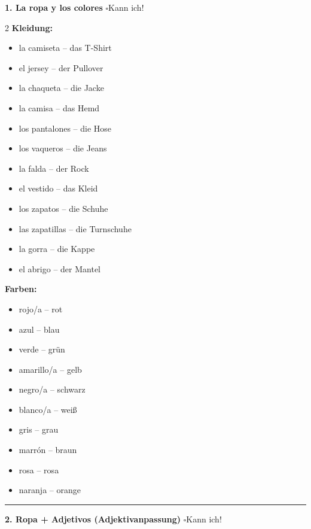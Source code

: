 \documentclass[10pt, a4paper]{article}
\newcommand{\checkbox}{$\square$\hspace{5pt}}
\begin{document}
\begin{themabox}

\textbf{\textcolor{spanisch}{1. La ropa y los colores}} \hfill \checkbox Kann ich!

\begin{multicols}{2}
\small
\textbf{Kleidung:}
\begin{itemize}[leftmargin=15pt, itemsep=1pt]
    \item la camiseta -- das T-Shirt
    \item el jersey -- der Pullover
    \item la chaqueta -- die Jacke
    \item la camisa -- das Hemd
    \item los pantalones -- die Hose
    \item los vaqueros -- die Jeans
    \item la falda -- der Rock
    \item el vestido -- das Kleid
    \item los zapatos -- die Schuhe
    \item las zapatillas -- die Turnschuhe
    \item la gorra -- die Kappe
    \item el abrigo -- der Mantel
\end{itemize}

\columnbreak

\textbf{Farben:}
\begin{itemize}[leftmargin=15pt, itemsep=1pt]
    \item rojo/a -- rot
    \item azul -- blau
    \item verde -- grün
    \item amarillo/a -- gelb
    \item negro/a -- schwarz
    \item blanco/a -- weiß
    \item gris -- grau
    \item marrón -- braun
    \item rosa -- rosa
    \item naranja -- orange
\end{itemize}
\end{multicols}

\vspace{3pt}
\hrule
\vspace{3pt}

\textbf{\textcolor{spanisch}{2. Ropa + Adjetivos (Adjektivanpassung)}} \hfill \checkbox Kann ich!


\end{themabox}
\end{document}
